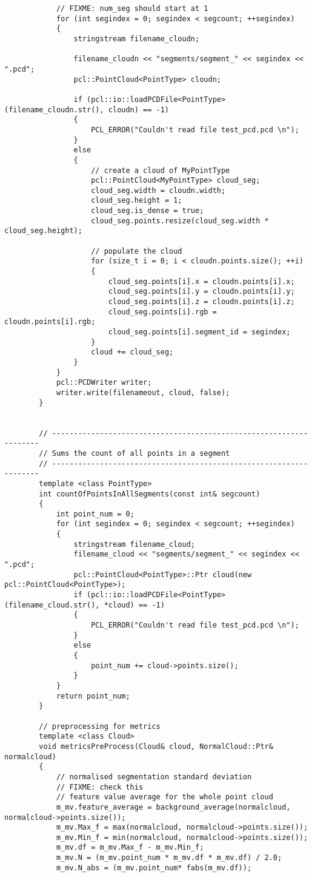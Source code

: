 \begin{lstlisting}
			// FIXME: num_seg should start at 1
			for (int segindex = 0; segindex < segcount; ++segindex)
			{
				stringstream filename_cloudn;

				filename_cloudn << "segments/segment_" << segindex << ".pcd";
				pcl::PointCloud<PointType> cloudn;

				if (pcl::io::loadPCDFile<PointType>(filename_cloudn.str(), cloudn) == -1)
				{
					PCL_ERROR("Couldn't read file test_pcd.pcd \n");
				}
				else
				{
					// create a cloud of MyPointType
					pcl::PointCloud<MyPointType> cloud_seg;
					cloud_seg.width = cloudn.width;
					cloud_seg.height = 1;
					cloud_seg.is_dense = true;
					cloud_seg.points.resize(cloud_seg.width * cloud_seg.height);

					// populate the cloud
					for (size_t i = 0; i < cloudn.points.size(); ++i)
					{
						cloud_seg.points[i].x = cloudn.points[i].x;
						cloud_seg.points[i].y = cloudn.points[i].y;
						cloud_seg.points[i].z = cloudn.points[i].z;
						cloud_seg.points[i].rgb = cloudn.points[i].rgb;
						cloud_seg.points[i].segment_id = segindex;
					}
					cloud += cloud_seg;
				}
			}
			pcl::PCDWriter writer;
			writer.write(filenameout, cloud, false);
		}


		// -------------------------------------------------------------------
		// Sums the count of all points in a segment
		// -------------------------------------------------------------------
		template <class PointType>
		int countOfPointsInAllSegments(const int& segcount)
		{
			int point_num = 0;
			for (int segindex = 0; segindex < segcount; ++segindex)
			{
				stringstream filename_cloud;
				filename_cloud << "segments/segment_" << segindex << ".pcd";
				pcl::PointCloud<PointType>::Ptr cloud(new pcl::PointCloud<PointType>);
				if (pcl::io::loadPCDFile<PointType>(filename_cloud.str(), *cloud) == -1)
				{
					PCL_ERROR("Couldn't read file test_pcd.pcd \n");
				}
				else
				{
					point_num += cloud->points.size();
				}
			}
			return point_num;
		}

		// preprocessing for metrics
		template <class Cloud>
		void metricsPreProcess(Cloud& cloud, NormalCloud::Ptr& normalcloud)
		{
			// normalised segmentation standard deviation
			// FIXME: check this
			// feature value average for the whole point cloud
			m_mv.feature_average = background_average(normalcloud, normalcloud->points.size());
			m_mv.Max_f = max(normalcloud, normalcloud->points.size());
			m_mv.Min_f = min(normalcloud, normalcloud->points.size());
			m_mv.df = m_mv.Max_f - m_mv.Min_f;
			m_mv.N = (m_mv.point_num * m_mv.df * m_mv.df) / 2.0;
			m_mv.N_abs = (m_mv.point_num* fabs(m_mv.df));


\end{lstlisting}
